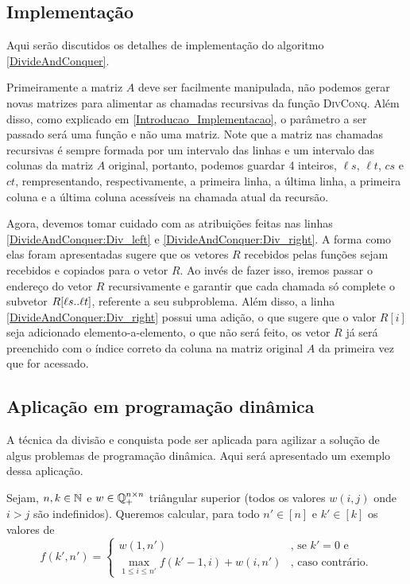 \subsection{Implementação} \label{DivisaoEConquista_Implementacao}
Aqui serão discutidos os detalhes de implementação do algoritmo \ref{DivideAndConquer}.  

Primeiramente a matriz $A$ deve ser facilmente manipulada, não podemos gerar novas matrizes para alimentar as chamadas recursivas da função \hbox{\textsc{DivConq}}. Além disso, como explicado em \ref{Introducao_Implementacao}, o parâmetro a ser passado será uma função e não uma matriz. Note que a matriz nas chamadas recursivas é sempre formada por um intervalo das linhas e um intervalo das colunas da matriz $A$ original, portanto, podemos guardar 4 inteiros, $\ell s$, $\ell t$, $cs$ e $ct$, rempresentando, respectivamente, a primeira linha, a última linha, a primeira coluna e a última coluna acessíveis na chamada atual da recursão.  

Agora, devemos tomar cuidado com as atribuições feitas nas linhas \ref{DivideAndConquer:Div_left} e \ref{DivideAndConquer:Div_right}. A forma como elas foram apresentadas sugere que os vetores $R$ recebidos pelas funções sejam recebidos e copiados para o vetor $R$. Ao invés de fazer isso, iremos passar o endereço do vetor $R$ recursivamente e garantir que cada chamada só complete o subvetor $R[\ell s .. \ell t]$, referente a seu subproblema. Além disso, a linha \ref{DivideAndConquer:Div_right} possui uma adição, o que sugere que o valor $R[i]$ seja adicionado elemento-a-elemento, o que não será feito, os vetor $R$ já será preenchido com o índice correto da coluna na matriz original $A$ da primeira vez que for acessado.

\subsection{Aplicação em programação dinâmica} \label{DivisaoEConquista_PD}
A técnica da divisão e conquista pode ser aplicada para agilizar a solução de algus problemas de programação dinâmica. Aqui será apresentado um exemplo dessa aplicação.  

Sejam, $n,k \in \mathbb{N}$ e $w \in \mathbb{Q}_+^{n \times n}$ triângular superior (todos os valores $w(i,j)$ onde $i>j$ são indefinidos). Queremos calcular, para todo $n' \in [n]$ e $k' \in [k]$ os valores de
$$ f(k',n') = \begin{cases}
    w(1, n') & \text{, se } k' = 0 \text{ e }\\
    \max_{1 \leq i \leq n'} f(k'-1, i) + w(i,n') & \text{, caso contrário.}
\end{cases} $$

